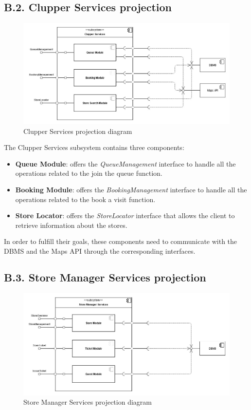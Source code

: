 \subsection{B.2. Clupper Services projection}

\begin{figure}[H]
\centering
\includegraphics{components_view/clupper_services_projection}
\caption{Clupper Services projection diagram}
\end{figure}

The Clupper Services subsystem contains three components:
\begin{itemize}
\item
    \textbf{Queue Module}: offers the \emph{QueueManagement} interface to handle all the operations related to the join the queue function.
\item
    \textbf{Booking Module}: offers the \emph{BookingManagement} interface to handle all the operations related to the book a visit function.
\item
    \textbf{Store Locator}: offers the \emph{StoreLocator} interface that allows the client to retrieve information about the stores.
\end{itemize}
In order to fulfill their goals, these components need to communicate with the DBMS and the Maps API through the corresponding interfaces.

\subsection{B.3. Store Manager Services projection}

\begin{figure}[H]
\centering
\includegraphics{components_view/store_manager_services_projection}
\caption{Store Manager Services projection diagram}
\end{figure}

